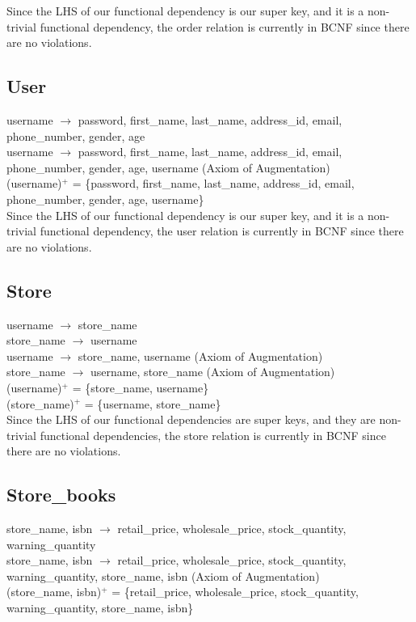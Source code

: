 \documentclass{article}
\begin{document}
    \noindent Since the LHS of our functional dependency is our super key, and it is a non-trivial functional dependency, the order relation is currently in BCNF since there are no violations. \\
    
    \subsection{User}
    username $\rightarrow$ password, first\_name, last\_name, address\_id, email, phone\_number, gender, age \\
    username $\rightarrow$ password, first\_name, last\_name, address\_id, email, phone\_number, gender, age, username (Axiom of Augmentation)\\
    (username)$^+$ = \{password, first\_name, last\_name, address\_id, email, phone\_number, gender, age, username\} \\
    \noindent Since the LHS of our functional dependency is our super key, and it is a non-trivial functional dependency, the user relation is currently in BCNF since there are no violations. \\
    
    \subsection{Store}
    username $\rightarrow$ store\_name \\
    store\_name $\rightarrow$ username \\
    username $\rightarrow$ store\_name, username (Axiom of Augmentation) \\
    store\_name $\rightarrow$ username, store\_name (Axiom of Augmentation) \\
    (username)$^+$ = \{store\_name, username\} \\
    (store\_name)$^+$ = \{username, store\_name\} \\
    
    \noindent Since the LHS of our functional dependencies are super keys, and they are non-trivial functional dependencies, the store relation is currently in BCNF since there are no violations. \\
    
    \subsection{Store\_books}
    store\_name, isbn $\rightarrow$ retail\_price, wholesale\_price, stock\_quantity, warning\_quantity \\
    store\_name, isbn $\rightarrow$ retail\_price, wholesale\_price, stock\_quantity, warning\_quantity, store\_name, isbn (Axiom of Augmentation) \\
    (store\_name, isbn)$^+$ = \{retail\_price, wholesale\_price, stock\_quantity, warning\_quantity, store\_name, isbn\} \\
    
\end{document}
